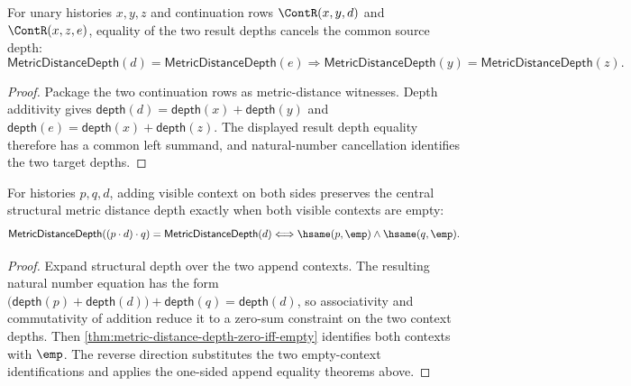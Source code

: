 \begin{theorem}
\label{thm:metric-distance-depth-same-source-cont-result-cancel}
For unary histories $x,y,z$ and continuation rows
$\ContR(x,y,d)$ and $\ContR(x,z,e)$, equality of the two result depths cancels
the common source depth:
$$
\mathsf{MetricDistanceDepth}(d)=\mathsf{MetricDistanceDepth}(e)
\Longrightarrow
\mathsf{MetricDistanceDepth}(y)=\mathsf{MetricDistanceDepth}(z).
$$
\end{theorem}
\begin{proof}
Package the two continuation rows as metric-distance witnesses. Depth
additivity gives
$\mathsf{depth}(d)=\mathsf{depth}(x)+\mathsf{depth}(y)$ and
$\mathsf{depth}(e)=\mathsf{depth}(x)+\mathsf{depth}(z)$. The displayed result
depth equality therefore has a common left summand, and natural-number
cancellation identifies the two target depths.
\end{proof}

\begin{theorem}
\label{thm:metric-distance-depth-visible-context-eq-iff-empty}
For histories $p,q,d$, adding visible context on both sides preserves the
central structural metric distance depth exactly when both visible contexts are
empty:
$$
\mathsf{MetricDistanceDepth}((p\cdot d)\cdot q)
=\mathsf{MetricDistanceDepth}(d)
\Longleftrightarrow
\hsame(p,\emp)\land\hsame(q,\emp).
$$
\end{theorem}
\begin{proof}
Expand structural depth over the two append contexts. The resulting natural
number equation has the form
$\bigl(\mathsf{depth}(p)+\mathsf{depth}(d)\bigr)+\mathsf{depth}(q)
=\mathsf{depth}(d)$, so associativity and commutativity of addition reduce it
to a zero-sum constraint on the two context depths. Then
\autoref{thm:metric-distance-depth-zero-iff-empty} identifies both contexts
with $\emp$. The reverse direction substitutes the two empty-context
identifications and applies the one-sided append equality theorems above.
\end{proof}

